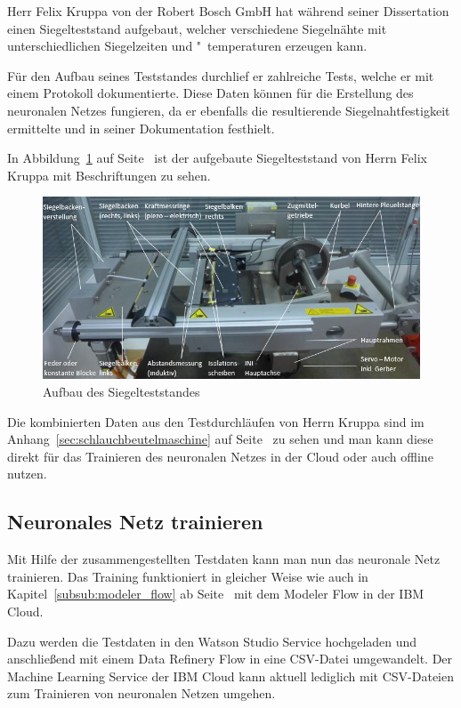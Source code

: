 Herr Felix Kruppa von der Robert Bosch GmbH hat während seiner Dissertation einen Siegelteststand aufgebaut, welcher
verschiedene Siegelnähte mit unterschiedlichen Siegelzeiten und "~temperaturen erzeugen kann.

Für den Aufbau seines Teststandes durchlief er zahlreiche Tests, welche er mit einem Protokoll dokumentierte. Diese
Daten können für die Erstellung des neuronalen Netzes fungieren, da er ebenfalls die resultierende Siegelnahtfestigkeit
ermittelte und in seiner Dokumentation festhielt.

In Abbildung~\ref{fig:siegelmaschinen_vffs_simulator} auf Seite~\pageref{fig:siegelmaschinen_vffs_simulator} ist der
aufgebaute Siegelteststand von Herrn Felix Kruppa mit Beschriftungen zu sehen.

\begin{figure}[h]
    \centering
    \includegraphics[width=\textwidth]{images/kapitel_5/vffs_simulator.png}
    \caption{Aufbau des Siegelteststandes}
    \label{fig:siegelmaschinen_vffs_simulator}
\end{figure}

Die kombinierten Daten aus den Testdurchläufen von Herrn Kruppa sind im Anhang~\ref{sec:schlauchbeutelmaschine}
auf Seite~\pageref{sec:schlauchbeutelmaschine} zu sehen und man kann diese direkt für das Trainieren des neuronalen
Netzes in der Cloud oder auch offline nutzen.

\subsection{Neuronales Netz trainieren}
Mit Hilfe der zusammengestellten Testdaten kann man nun das neuronale Netz trainieren. Das Training funktioniert in
gleicher Weise wie auch in Kapitel~\ref{subsub:modeler_flow} ab Seite~\pageref{subsub:modeler_flow} mit dem Modeler
Flow in der IBM Cloud.

Dazu werden die Testdaten in den Watson Studio Service hochgeladen und anschließend mit einem Data Refinery Flow in eine
CSV-Datei umgewandelt. Der Machine Learning Service der IBM Cloud kann aktuell lediglich mit CSV-Dateien zum Trainieren
von neuronalen Netzen umgehen.

